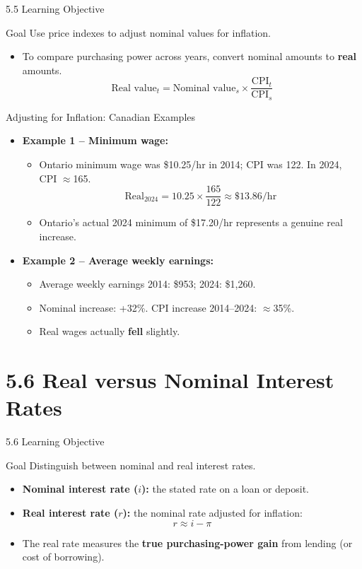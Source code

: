 \documentclass[aspectratio=169]{beamer}
\begin{document}
\begin{frame}{5.5 Learning Objective}
\transfade
\begin{block}{Goal}
Use price indexes to adjust nominal values for inflation.
\end{block}
\begin{itemize}
  \item To compare purchasing power across years, convert nominal amounts to \textbf{real} amounts.
  \[
    \text{Real value}_t = \text{Nominal value}_s \times \frac{\text{CPI}_t}{\text{CPI}_s}
  \]
\end{itemize}
\end{frame}

\begin{frame}{Adjusting for Inflation: Canadian Examples}
\transfade
\begin{itemize}
  \item \textbf{Example 1 -- Minimum wage:}
  \begin{itemize}
    \item Ontario minimum wage was \$10.25/hr in 2014; CPI was 122. In 2024, CPI $\approx$165.
    \[
      \text{Real}_{2024} = 10.25 \times \frac{165}{122} \approx \$13.86/\text{hr}
    \]
    \item Ontario's actual 2024 minimum of \$17.20/hr represents a genuine real increase.
  \end{itemize}
  \item \textbf{Example 2 -- Average weekly earnings:}
  \begin{itemize}
    \item Average weekly earnings 2014: \$953; 2024: \$1,260.
    \item Nominal increase: +32\%. CPI increase 2014--2024: $\approx$35\%.
    \item Real wages actually \textbf{fell} slightly.
  \end{itemize}
\end{itemize}
\end{frame}

\section{5.6 Real versus Nominal Interest Rates}

\begin{frame}{5.6 Learning Objective}
\transfade
\begin{block}{Goal}
Distinguish between nominal and real interest rates.
\end{block}
\begin{itemize}
  \item \textbf{Nominal interest rate ($i$):} the stated rate on a loan or deposit.
  \item \textbf{Real interest rate ($r$):} the nominal rate adjusted for inflation:
  \[
    r \approx i - \pi
  \]
  \item The real rate measures the \textbf{true purchasing-power gain} from lending (or cost of borrowing).
\end{itemize}
\end{frame}
\end{document}
